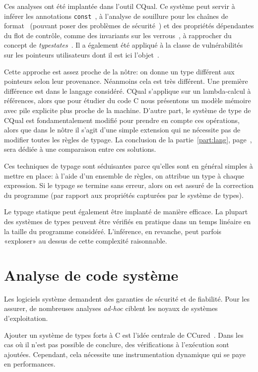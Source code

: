 Ces analyses ont été implantée dans l'outil CQual. Ce système peut servir à
inférer les annotations \texttt{const}~\cite{pldi99}, à l'analyse de souillure
pour les chaînes de format~\cite{usenix01} (pouvant poser des problèmes de
sécurité~\cite{format-string-attacks}) et des propriétés dépendantes du flot de
contrôle, comme des invariants sur les verrous~\cite{pldi02}, à rapprocher du
concept de \emph{typestates}~\cite{tse12-typestate}.
Il a également été appliqué
à la classe de vulnérabilités sur les pointeurs utilisateurs dont il est ici
l'objet~\cite{cquk-usenix04}.

Cette approche est assez proche de la nôtre: on donne un type différent aux
pointeurs selon leur provenance. Néanmoins cela est très différent. Une première
différence est dans le langage considéré. CQual s'applique sur un lambda-calcul
à références, alors que pour étudier du code C nous présentons un modèle mémoire
avec pile explicite plus proche de la machine. D'autre part, le système de type
de CQual est fondamentalement modifié pour prendre en compte ces opérations,
alors que dans le nôtre il s'agit d'une simple extension qui ne nécessite pas de
modifier toutes les règles de typage. La conclusion de la
partie~\ref{part:lang}, page~\pageref{cha:ccl2}, sera dédiée à une comparaison
entre ces solutions.

Ces techniques de typage sont séduisantes parce qu'elles sont en général simples
à mettre en place: à l'aide d'un ensemble de règles, on attribue un type à
chaque expression. Si le typage se termine sans erreur, alors on est assuré de
la correction du programme (par rapport aux propriétés capturées par le système
de types).

Le typage statique peut également être implanté de manière efficace. La plupart
des systèmes de types peuvent être vérifiés en pratique dans un temps linéaire
en la taille du programme considéré. L'inférence, en revanche, peut parfois
«exploser» au dessus de cette complexité raisonnable.


\section{Analyse de code système}

Les logiciels système demandent des garanties de sécurité et de fiabilité. Pour
les assurer, de nombreuses analyses \emph{ad-hoc} ciblent les noyaux de systèmes
d'exploitation.

Ajouter un système de types forts à C est l'idée centrale de
CCured~\cite{ccured-toplas}. Dans les cas où il n'est pas possible de conclure,
des vérifications à l'exécution sont ajoutées. Cependant, cela nécessite une
instrumentation dynamique qui se paye en performances.


